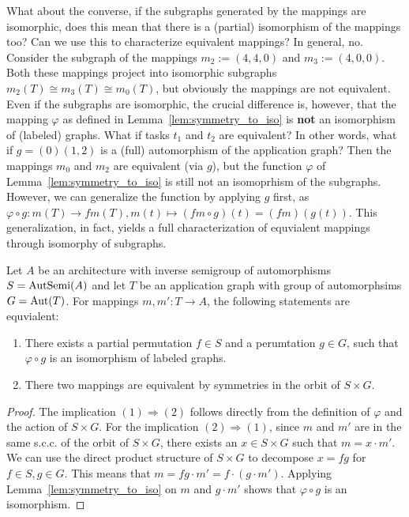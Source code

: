 What about the converse, if the subgraphs generated by the mappings are isomorphic, does this mean that there is a (partial) isomorphism of the mappings too? Can we use this to characterize equivalent mappings? 
In general, no.
Consider the subgraph of the mappings $m_2 := (4,4,0)$ and $m_3 := (4,0,0)$. Both these mappings project into isomorphic subgraphs $m_2(T) \cong m_3(T) \cong m_0(T)$, but obviously the mappings are not equivalent.
Even if the subgraphs are isomorphic, the crucial difference is, however, that the mapping $\varphi$ as defined in Lemma~\ref{lem:symmetry_to_iso} is \textbf{not} an isomorphism of (labeled) graphs. 
What if tasks $t_1$ and $t_2$ are equivalent?
In other words,  what if $g = (0)(1,2)$ is a (full) automorphism of the application graph?
Then the mappings $m_0$ and $m_2$ are equivalent (via $g$), but the function $\varphi$ of Lemma~\ref{lem:symmetry_to_iso} is still not an isomoprhism of the subgraphs.
However, we can generalize the function by applying $g$ first, as $\varphi \circ g : m(T) \rightarrow fm(T), m(t) \mapsto (fm \circ g)(t) = (fm)(g(t))$.
This generalization, in fact, yields a full characterization of equvialent mappings through isomorphy of subgraphs.
\begin{thm}
Let $A$ be an architecture with inverse semigroup of automorphisms $S = \operatorname{AutSemi}(A)$ and let $T$ be an application graph with group of automorphsims $G = \operatorname{Aut}(T)$.
For mappings $m,m' : T \rightarrow A$, the following statements are equvialent:
\begin{enumerate}
\item There exists a partial permutation $f \in S$ and a perumtation $g \in G$, such that $\varphi \circ g$ is an isomorphism of labeled graphs.
\item There two mappings are equivalent by symmetries in the orbit of $S \times G$.
\end{enumerate}
\begin{proof}
The implication $(1) \Rightarrow (2)$ follows directly from the definition of $\varphi$ and the action of $S \times G$.
For the implication $(2) \Rightarrow (1)$, since $m$ and $m'$ are in the same s.c.c. of the orbit of $S \times G$, there exists an $x \in S \times G$ such that $m = x \cdot m'$.
We can use the direct product structure of $S \times G$ to decompose $ x = fg$ for $f \in S, g \in G$.
This means that $m = fg \cdot m' = f \cdot (g \cdot m')$.
Applying Lemma~\ref{lem:symmetry_to_iso} on $m$ and $g \cdot m'$ shows that $\varphi \circ g$ is an isomorphism.
\end{proof}
\end{thm}

